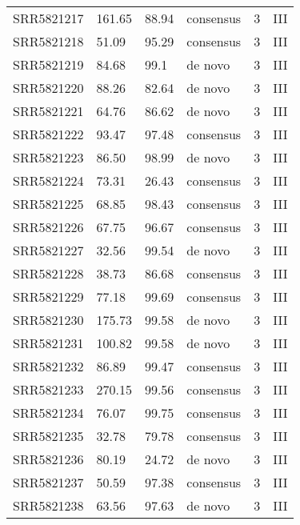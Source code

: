 \begin{scriptsize}
\begin{center}
\begin{longtable}{@{}llllll@{}}
SRR5821217 & 161.65        & 88.94       & consensus    & 3        & III      \\
SRR5821218 & 51.09         & 95.29       & consensus    & 3        & III      \\
SRR5821219 & 84.68         & 99.1        & de novo      & 3        & III      \\
SRR5821220 & 88.26         & 82.64       & de novo      & 3        & III      \\
SRR5821221 & 64.76         & 86.62       & de novo      & 3        & III      \\
SRR5821222 & 93.47         & 97.48       & consensus    & 3        & III      \\
SRR5821223 & 86.50         & 98.99       & de novo      & 3        & III      \\
SRR5821224 & 73.31         & 26.43       & consensus    & 3        & III      \\
SRR5821225 & 68.85         & 98.43       & consensus    & 3        & III      \\
SRR5821226 & 67.75         & 96.67       & consensus    & 3        & III      \\
SRR5821227 & 32.56         & 99.54       & de novo      & 3        & III      \\
SRR5821228 & 38.73         & 86.68       & consensus    & 3        & III      \\
SRR5821229 & 77.18         & 99.69       & consensus    & 3        & III      \\
SRR5821230 & 175.73        & 99.58       & de novo      & 3        & III      \\
SRR5821231 & 100.82        & 99.58       & de novo      & 3        & III      \\
SRR5821232 & 86.89         & 99.47       & consensus    & 3        & III      \\
SRR5821233 & 270.15        & 99.56       & consensus    & 3        & III      \\
SRR5821234 & 76.07         & 99.75       & consensus    & 3        & III      \\
SRR5821235 & 32.78         & 79.78       & consensus    & 3        & III      \\
SRR5821236 & 80.19         & 24.72       & de novo      & 3        & III      \\
SRR5821237 & 50.59         & 97.38       & consensus    & 3        & III      \\
SRR5821238 & 63.56         & 97.63       & de novo      & 3        & III      \\

\end{longtable}
\end{center}
\end{scriptsize}
